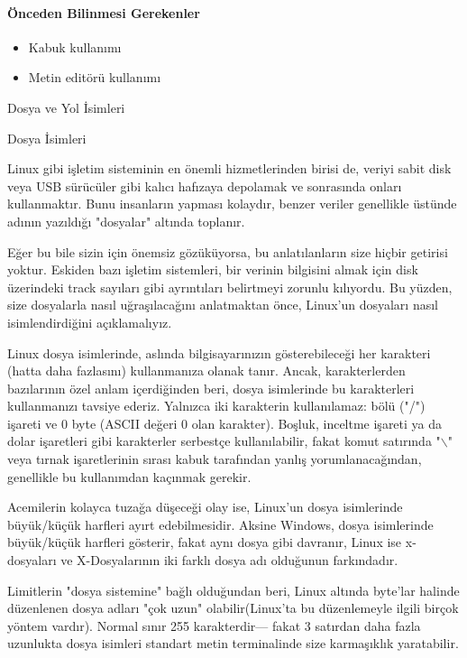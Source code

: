 \documentclass[10pt,a5paper]{book}
\begin{document}
\paragraph{Önceden Bilinmesi Gerekenler}
\begin{itemize}
 \item Kabuk kullanımı
 \item Metin editörü kullanımı
 \end{itemize}

\begin{section}{Dosya ve Yol İsimleri}
\begin{subsection}{Dosya İsimleri}

Linux gibi işletim sisteminin en önemli hizmetlerinden birisi de, veriyi sabit disk veya USB sürücüler gibi kalıcı hafızaya depolamak ve sonrasında onları kullanmaktır. Bunu insanların yapması kolaydır, benzer veriler genellikle üstünde adının yazıldığı "dosyalar" altında toplanır.

Eğer bu bile sizin için önemsiz gözüküyorsa, bu anlatılanların size hiçbir getirisi yoktur. Eskiden bazı işletim sistemleri, bir verinin bilgisini almak için disk üzerindeki track sayıları gibi ayrıntıları belirtmeyi zorunlu kılıyordu. Bu yüzden, size dosyalarla nasıl uğraşılacağını anlatmaktan önce, Linux'un dosyaları nasıl isimlendirdiğini açıklamalıyız.

Linux dosya isimlerinde, aslında bilgisayarınızın gösterebileceği her karakteri (hatta daha fazlasını) kullanmanıza olanak tanır. Ancak, karakterlerden bazılarının özel anlam içerdiğinden beri, dosya isimlerinde bu karakterleri kullanmanızı tavsiye ederiz. Yalnızca iki karakterin kullanılamaz: bölü ("/") işareti ve 0 byte (ASCII değeri 0 olan karakter). Boşluk, inceltme işareti ya da dolar işaretleri gibi karakterler serbestçe kullanılabilir, fakat komut satırında "$\backslash$" veya tırnak işaretlerinin sırası kabuk tarafından yanlış yorumlanacağından, genellikle bu kullanımdan kaçınmak gerekir.

Acemilerin kolayca tuzağa düşeceği olay ise, Linux'un dosya isimlerinde büyük/küçük harfleri ayırt edebilmesidir. Aksine Windows, dosya isimlerinde büyük/küçük harfleri gösterir, fakat aynı dosya gibi davranır, Linux ise x-dosyaları ve X-Dosyalarının iki farklı dosya adı olduğunun farkındadır.

	Limitlerin "dosya sistemine" bağlı olduğundan beri, Linux altında byte'lar halinde düzenlenen dosya adları "çok uzun" olabilir(Linux'ta  bu düzenlemeyle ilgili birçok yöntem vardır). Normal sınır 255 karakterdir— fakat 3 satırdan daha fazla uzunlukta dosya isimleri standart metin terminalinde size karmaşıklık yaratabilir.
	

\end{subsection}
\end{section}
\end{document}
